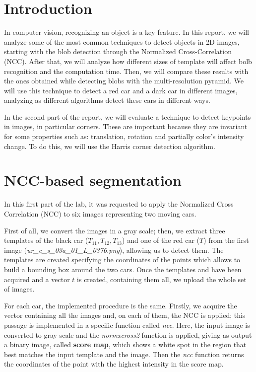 \chapter*{Introduction}

In computer vision, recognizing an object is a key feature. In this report, we will analyze some of the most common techniques to detect objects in 2D images, starting with the blob detection through the Normalized Cross-Correlation (NCC). After that, we will analyze how different sizes of template will affect bolb recognition and the computation time. Then, we will compare these results with the ones obtained while detecting blobs with the multi-resolution pyramid. We will use this technique to detect a red car and a dark car in different images, analyzing as different algorithms detect these cars in different ways.

In the second part of the report, we will evaluate a technique to detect keypoints in images, in particular corners. These are important because they are invariant for some properties such as: translation, rotation and partially color's intensity change. To do this, we will use the Harris corner detection algorithm.

\chapter{NCC-based segmentation}
In this first part of the lab, it was requested to apply the Normalized Cross Correlation (NCC) to six images 
representing two moving cars.

First of all, we convert the images in a gray scale; then, we extract three templates of the black 
car ($T_{11}, T_{12}, T_{13}$) and one of the red car ($T$) from the first image (\textit{ur\_c\_s\_03a\_01\_L\_0376.png}), allowing us to detect them.
The templates are created specifying the coordinates of the points which allows to build a bounding box around the two cars. Once the templates and have been acquired and a vector $t$ is created, containing them all, we upload the whole set of images.

For each car, the implemented procedure is the same. 
Firstly, we acquire the vector containing all the images and, on each of them, the NCC is applied; this passage is implemented in a specific function called \textit{ncc}.
Here, the input image is converted to gray scale and the \textit{normxcross2} function is applied, giving as output a binary image, called \textbf{score map}, which shows a white spot in the region that best matches the input template and the image. Then the \textit{ncc} function returns the coordinates of the point with the highest intensity in the score map.

